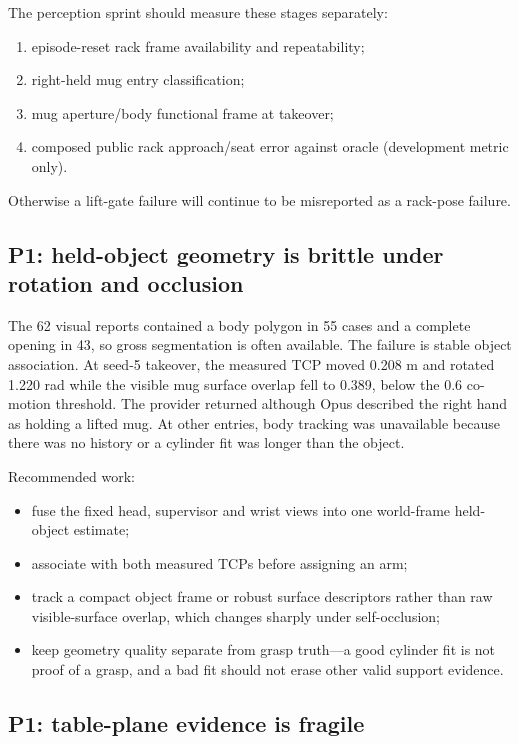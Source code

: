\documentclass[10pt]{article}
\newcommand{\code}[1]{\texttt{\detokenize{#1}}}
\begin{document}
The perception sprint should measure these stages separately:

\begin{enumerate}
  \item episode-reset rack frame availability and repeatability;
  \item right-held mug entry classification;
  \item mug aperture/body functional frame at takeover;
  \item composed public rack approach/seat error against oracle (development metric only).
\end{enumerate}

Otherwise a lift-gate failure will continue to be misreported as a rack-pose failure.

\subsection{P1: held-object geometry is brittle under rotation and occlusion}

The 62 visual reports contained a body polygon in 55 cases and a complete opening in 43, so gross
segmentation is often available. The failure is stable object association. At seed-5 takeover,
the measured TCP moved 0.208 m and rotated 1.220 rad while the visible mug surface overlap fell to
0.389, below the 0.6 co-motion threshold. The provider returned
\code{mug_tcp_motion_inconsistent} although Opus described the right hand as holding a lifted mug.
At other entries, body tracking was unavailable because there was no history or a cylinder fit was
longer than the object.

Recommended work:

\begin{itemize}
  \item fuse the fixed head, supervisor and wrist views into one world-frame held-object estimate;
  \item associate with both measured TCPs before assigning an arm;
  \item track a compact object frame or robust surface descriptors rather than raw visible-surface
        overlap, which changes sharply under self-occlusion;
  \item keep geometry quality separate from grasp truth---a good cylinder fit is not proof of a
        grasp, and a bad fit should not erase other valid support evidence.
\end{itemize}

\subsection{P1: table-plane evidence is fragile}
\end{document}
